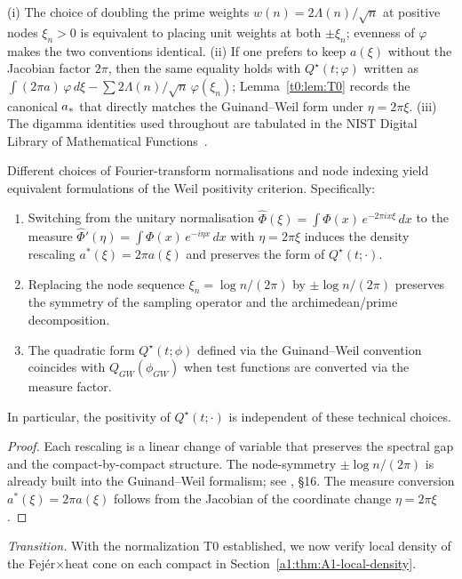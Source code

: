 \begin{remark}
(i) The choice of doubling the prime weights $w(n)=2\Lambda(n)/\sqrt n$ at positive nodes $\xi_n>0$ is equivalent to placing unit weights at both $\pm\xi_n$; evenness of $\varphi$ makes the two conventions identical. (ii) If one prefers to keep $a(\xi)$ without the Jacobian factor $2\pi$, then the same equality holds with $Q^\star(t;\varphi)$ written as $\int (2\pi a)\,\varphi\,d\xi-\sum 2\Lambda(n)/\sqrt n\,\varphi(\xi_n)$; Lemma~\ref{t0:lem:T0} records the canonical $a_*$ that directly matches the Guinand--Weil form under $\eta=2\pi\xi$. (iii) The digamma identities used throughout are tabulated in the NIST Digital Library of Mathematical Functions~\cite{NISTDLMF}.
\end{remark}

\begin{lemma}\label{lem:T0-normalisation-invariance-full}
Different choices of Fourier-transform normalisations and node indexing yield
equivalent formulations of the Weil positivity criterion.  Specifically:
\begin{enumerate}[label=(\alph*)]
  \item Switching from the unitary normalisation $\widehat\Phi(\xi)=\int \Phi(x)\,e^{-2\pi i x\xi}\,dx$
  to the measure $\widehat\Phi'(\eta)=\int \Phi(x)\,e^{-i\eta x}\,dx$ with $\eta=2\pi\xi$
  induces the density rescaling $a^*(\xi)=2\pi a(\xi)$ and preserves the form of $Q^\star(t;\cdot)$.
  \item Replacing the node sequence $\xi_n=\log n/(2\pi)$ by $\pm\log n/(2\pi)$
  preserves the symmetry of the sampling operator and the archimedean/prime decomposition.
  \item The quadratic form $Q^\star(t;\phi)$ defined via the Guinand--Weil convention
  coincides with $Q_{GW}(\phi_{GW})$ when test functions are converted via the measure factor.
\end{enumerate}
In particular, the positivity of $Q^\star(t;\cdot)$ is independent of these technical choices.
\end{lemma}
\begin{proof}
Each rescaling is a linear change of variable that preserves the spectral gap
and the compact-by-compact structure.  The node-symmetry $\pm\log n/(2\pi)$
is already built into the Guinand--Weil formalism; see \cite{Weil1952}, §16.
The measure conversion $a^*(\xi)=2\pi a(\xi)$ follows from the Jacobian of the
coordinate change $\eta=2\pi\xi$.
\end{proof}

\smallskip
\noindent\textit{Transition.}
With the normalization T0 established, we now verify local density of the Fej\'er$\times$heat cone on each compact in Section~\ref{a1:thm:A1-local-density}.
